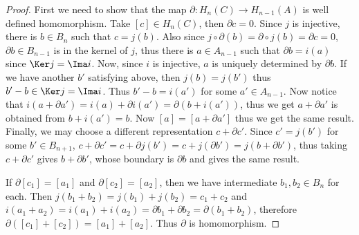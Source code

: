 \begin{proof}
First we need to show that the map $\partial:H_n(C)\rightarrow H_{n-1}(A)$ is well defined homomorphism. Take $[c]\in H_n(C)$, then $\partial c=0$. Since $j$ is injective, there is $b\in B_n$ such that $c=j(b)$. Also since $j\circ \partial(b)=\partial\circ j(b)=\partial c=0$, $\partial b\in B_{n-1}$ is in the kernel of $j$, thus there is $a\in A_{n-1}$ such that $\partial b=i(a)$ since $\Ker j=\Ima i$. Now, since $i$ is injective, $a$ is uniquely determined by $\partial b$. If we have another $b'$ satisfying above, then $j(b)=j(b')$ thus $b'-b\in \Ker j=\Ima i$. Thus $b'-b=i(a')$ for some $a'\in A_{n-1}$. Now notice that $i(a+\partial a')=i(a)+\partial i(a')=\partial(b+i(a'))$, thus we get $a+\partial a'$ is obtained from $b+i(a')=b$. Now $[a]=[a+\partial a']$ thus we get the same result. Finally, we may choose a different representation $c+\partial c'$. Since $c'=j(b')$ for some $b'\in B_{n+1}$, $c+\partial c'=c+\partial j(b')=c+j(\partial b')=j(b+\partial b')$, thus taking $c+\partial c'$ gives $b+\partial b'$, whose boundary is $\partial b$ and gives the same result.

If $\partial [c_1]=[a_1]$ and $\partial [c_2]=[a_2]$, then we have intermediate $b_1,b_2\in B_n$ for each. Then $j(b_1+b_2)=j(b_1)+j(b_2)=c_1+c_2$ and $i(a_1+a_2)=i(a_1)+i(a_2)=\partial b_1+\partial b_2=\partial(b_1+b_2)$, therefore $\partial([c_1]+[c_2])=[a_1]+[a_2]$. Thus $\partial$ is homomorphism.


\end{proof}
